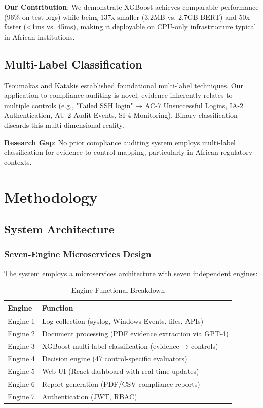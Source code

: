 \documentclass[11pt,conference]{IEEEtran}
\begin{document}
\textbf{Our Contribution}: We demonstrate XGBoost achieves comparable performance (96\% on test logs) while being 137x smaller (3.2MB vs. 2.7GB BERT) and 50x faster (<1ms vs. 45ms), making it deployable on CPU-only infrastructure typical in African institutions.

\subsection{Multi-Label Classification}

Tsoumakas and Katakis \cite{tsoumakas2007} established foundational multi-label techniques. Our application to compliance auditing is novel: evidence inherently relates to multiple controls (e.g., "Failed SSH login" → AC-7 Unsuccessful Logins, IA-2 Authentication, AU-2 Audit Events, SI-4 Monitoring). Binary classification discards this multi-dimensional reality.

\textbf{Research Gap}: No prior compliance auditing system employs multi-label classification for evidence-to-control mapping, particularly in African regulatory contexts.

\section{Methodology}

\subsection{System Architecture}

\subsubsection{Seven-Engine Microservices Design}

The system employs a microservices architecture with seven independent engines:

\begin{table}[h]
\centering
\caption{Engine Functional Breakdown}
\begin{tabular}{lp{}}
\toprule
\textbf{Engine} & \textbf{Function} \\
\midrule
Engine 1 & Log collection (syslog, Windows Events, files, APIs) \\
Engine 2 & Document processing (PDF evidence extraction via GPT-4) \\
Engine 3 & XGBoost multi-label classification (evidence → controls) \\
Engine 4 & Decision engine (47 control-specific evaluators) \\
Engine 5 & Web UI (React dashboard with real-time updates) \\
Engine 6 & Report generation (PDF/CSV compliance reports) \\
Engine 7 & Authentication (JWT, RBAC) \\
\bottomrule
\end{tabular}
\end{table}
\end{document}
